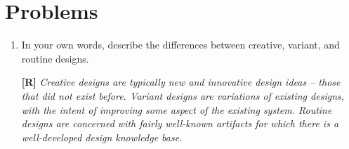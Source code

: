 \section{Problems}
\label{section:problems}


\begin{enumerate}
\def\labelenumi{\arabic{enumi}.}
\item
  In your own words, describe the differences between creative, variant,
  and routine designs.
 \begin{onlysolution}
 \textbf{[R]}
 \itshape
 Creative designs are typically new and innovative design ideas -- those
that did not exist before. Variant designs are variations of existing
designs, with the intent of improving some aspect of the existing
system. Routine designs are concerned with fairly well-known artifacts
for which there is a well-developed design knowledge base.
  \end{onlysolution}
  

\end{enumerate}
